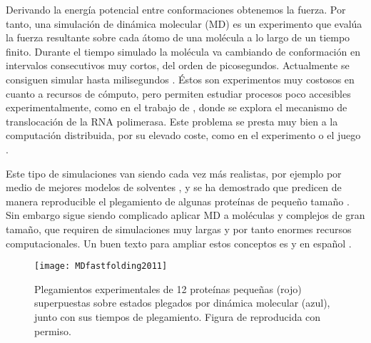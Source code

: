 Derivando la energ\'{i}a potencial entre conformaciones obtenemos la fuerza.
Por tanto, una simulaci\'{o}n de din\'{a}mica molecular (MD) es un experimento que eval\'{u}a la fuerza resultante sobre cada \'{a}tomo de una mol\'{e}cula 
a lo largo de un tiempo finito. Durante el tiempo simulado la mol\'{e}cula va cambiando de conformaci\'{o}n en intervalos consecutivos 
muy cortos, del orden de picosegundos. Actualmente se consiguen simular hasta milisegundos \citep{Shaw2010}.
\'{E}stos son experimentos muy costosos en cuanto a recursos de c\'{o}mputo, pero permiten estudiar procesos poco accesibles experimentalmente, 
como en el trabajo de \citet{Golosov2010}, donde se explora el mecanismo de translocaci\'{o}n de la RNA polimerasa. 
Este problema se presta muy bien a la computaci\'{o}n distribuida, por su elevado coste, como en el experimento 
 o el juego 
.

Este tipo de simulaciones van siendo cada vez m\'{a}s realistas, por ejemplo por medio de mejores modelos de solventes \citep{Lee2013},
y se ha demostrado que predicen de manera reproducible el plegamiento de algunas prote\'{i}nas de peque\~{n}o tama\~{n}o \citep{Lindorff-Larsen2011}.
Sin embargo sigue siendo complicado aplicar MD a mol\'{e}culas y complejos de gran tama\~{n}o, 
que requiren de simulaciones muy largas y por tanto enormes recursos computacionales.
Un buen texto para ampliar estos conceptos es \citet{Leach2001} y en espa\~{n}ol \citet{bueren_calabuig_juan_a_2014_1066360}.

\begin{figure}
\begin{center} 
\texttt{[image: MDfastfolding2011]}
\caption%
{
Plegamientos experimentales de 12 prote\'{i}nas peque\~{n}as (rojo) superpuestas sobre estados plegados por din\'{a}mica molecular (azul),
junto con sus tiempos de plegamiento.
Figura de \cite{Lindorff-Larsen2011} reproducida con permiso.
}
\label{fig:MDfastfolding}
\end{center}
\end{figure}



